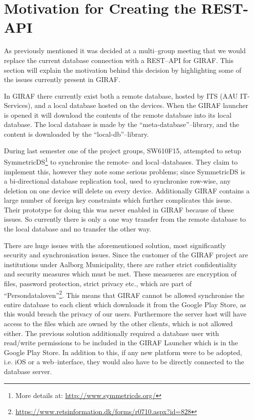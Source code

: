 \section{Motivation for Creating the REST-API} \label{sec:current} %
As previously mentioned it was decided at a multi--group meeting that we would replace the current database connection with a REST--API for GIRAF.
This section will explain the motivation behind this decision by highlighting some of the issues currently present in GIRAF.

In GIRAF there currently exist both a remote database, hosted by ITS (AAU IT-Services), and a local database hosted on the devices.
When the GIRAF launcher is opened it will download the contents of the remote database into its local database.
The local database is made by the ``meta-database''--library, and the content is downloaded by the ``local-db''--library.

During last semester one of the project groups, SW610F15, attempted to setup SymmetricDS\footnote{More details at: \url{http://www.symmetricds.org/}} to synchronise the remote- and local--databases.
They claim to implement this, however they note some serious problems; since SymmetricDS is a bi-directional database replication tool, used to synchronise row-wise, any deletion on one device will delete on every device.
Additionally GIRAF contains a large number of foreign key constraints which further complicates this issue.
Their prototype for doing this was never enabled in GIRAF because of these issues.
So currently there is only a one way transfer from the remote database to the local database and no transfer the other way.

\bigskip
There are huge issues with the aforementioned solution, most significantly security and synchronisation issues.
Since the customer of the GIRAF project are institutions under Aalborg Municipality, there are rather strict confidentiality and security measures which must be met.
These measueres are encryption of files, password protection, strict privacy etc., which are part of ``Persondataloven''\footnote{\url{https://www.retsinformation.dk/forms/r0710.aspx?id=828}}.
This means that GIRAF cannot be allowed synchronise the entire database to each client which downloads it from the Google Play Store, as this would breach the privacy of our users.
Furthermore the server host will have access to the files which are owned by the other clients, which is not allowed either.
The previous solution additionally required a database user with read/write permissions to be included in the GIRAF Launcher which is in the Google Play Store.
In addition to this, if any new platform were to be adopted, i.e. iOS or a web--interface, they would also have to be directly connected to the database server.

